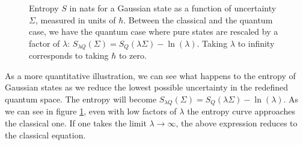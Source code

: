 \documentclass{article}
\begin{document}
\begin{figure}[h]
    \centering
{}
    \caption{Entropy $S$ in nats for a Gaussian state as a function of uncertainty $\Sigma$, measured in units of $\hbar$. Between the classical and the quantum case, we have the quantum case where pure states are rescaled by a factor of $\lambda$: $S_{\lambda Q}(\Sigma) = S_Q(\lambda \Sigma) - \ln(\lambda)$. Taking $\lambda$ to infinity corresponds to taking $\hbar$ to zero.}
    \label{fig:uncertainty_scaled}
\end{figure}

As a more quantitative illustration, we can see what happens to the entropy of Gaussian states as we reduce the lowest possible uncertainty in the redefined quantum space. The entropy will become $S_{\lambda Q}(\Sigma) = S_Q(\lambda \Sigma) - \ln(\lambda)$. As we can see in figure \ref{fig:uncertainty_scaled}, even with low factors of $\lambda$ the entropy curve approaches the classical one. If one takes the limit $\lambda \to \infty$, the above expression reduces to the classical equation.
\end{document}
